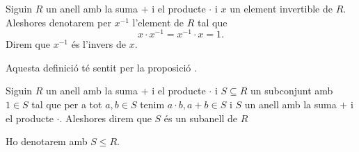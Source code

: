 \documentclass[../Apunts.tex]{subfiles}
\begin{document}
	\begin{definition}
		\label{def:l'invers d'un element d'un anell}
		Siguin \(R\) un anell amb la suma \(+\) i el producte \(\cdot\) i \(x\) un element invertible de \(R\). Aleshores denotarem per \(x^{-1}\) l'element de \(R\) tal que
		\[x\cdot x^{-1}=x^{-1}\cdot x=1.\]
		Direm que \(x^{-1}\) és l'invers de \(x\).
		
		Aquesta definició té sentit per la proposició .
	\end{definition}
	\begin{definition}[Subanell]
		\label{def:subanell}
		Siguin \(R\) un anell amb la suma \(+\) i el producte \(\cdot\) i \(S\subseteq R\) un subconjunt amb \(1\in S\) tal que per a tot \(a,b\in S\) tenim \(a\cdot b,a+b\in S\) i \(S\) un anell amb la suma \(+\) i el producte \(\cdot\). Aleshores direm que \(S\) és un subanell de \(R\)
		
		Ho denotarem amb \(S\leq R\).
	\end{definition}
\end{document}
